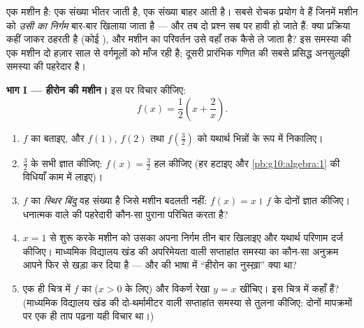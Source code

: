 \begin{problem}
\label{pb:g10:functions:1}
 एक मशीन है: एक संख्या भीतर जाती है, एक संख्या बाहर आती है। सबसे रोचक
प्रयोग वे हैं जिनमें मशीन को \emph{उसी का निर्गम} बार-बार खिलाया जाता है
--- और तब दो प्रश्न सब पर हावी हो जाते हैं: क्या प्रक्रिया कहीं जाकर ठहरती
है (कोई \emph{}), और मशीन का परिवर्तन उसे वहाँ तक कैसे ले जाता
है? इस समस्या की एक मशीन दो हज़ार साल से वर्गमूलों को माँज रही है; दूसरी
प्रारंभिक गणित की सबसे प्रसिद्ध अनसुलझी समस्या की पहरेदार है।

\medskip
\noindent\textbf{भाग I --- हीरोन की मशीन।}
इस  पर विचार कीजिए:
\[
f(x) = \frac12\left(x + \frac2x\right).
\]
\begin{enumerate}
  \item $f$ का  बताइए, और $f(1)$, $f(2)$ तथा $f\!\left(\frac32\right)$ को यथार्थ भिन्नों
        के रूप में निकालिए।
  \item $\frac32$ के सभी  ज्ञात कीजिए: $f(x) = \frac32$ हल कीजिए (हर हटाइए
        और \cref{pb:g10:algebra:1} की विधियाँ काम में लाइए)।
  \item $f$ का \emph{स्थिर बिंदु} वह संख्या है जिसे
        मशीन बदलती नहीं: $f(x) = x$। $f$ के दोनों  ज्ञात कीजिए।
        धनात्मक वाले की पहरेदारी कौन-सा पुराना परिचित करता है?
  \item $x = 1$ से शुरू करके मशीन को उसका अपना निर्गम तीन बार खिलाइए और
        यथार्थ परिणाम दर्ज कीजिए। माध्यमिक विद्यालय खंड की अपरिमेयता वाली
        सप्ताहांत समस्या का कौन-सा अनुक्रम आपने फिर से खड़ा कर दिया है ---
        और  की भाषा में ``हीरोन का नुस्ख़ा'' क्या था?
  \item एक ही चित्र में $f$ का  ($x > 0$ के लिए) और विकर्ण रेखा $y = x$
        खींचिए। इस चित्र में  कहाँ हैं? (माध्यमिक विद्यालय खंड
        की दो-थर्मामीटर वाली सप्ताहांत समस्या से तुलना कीजिए: दोनों
        मापक्रमों पर एक ही ताप पढ़ना यही विचार था।)
\end{enumerate}


\end{problem}
